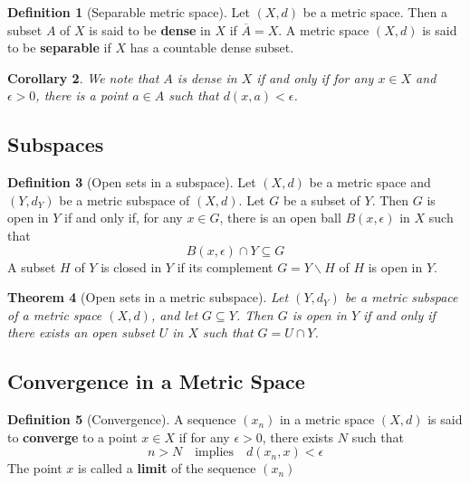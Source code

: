 \documentclass[10pt, oneside, reqno]{amsart}
\theoremstyle{plain}%
\newtheorem{thm}{Theorem}[section]
\newtheorem{cor}[thm]{Corollary}
\theoremstyle{definition}
\newtheorem{defn}[thm]{Definition}
\theoremstyle{remark}
\newcommand{\met}{(X,d)}
\newcommand{\ol}[1]{\overline{#1}}
\begin{document}
\begin{defn}[Separable metric space]
    Let $\met$ be a metric space.  Then a subset $A$ of $X$ is said to be \textbf{dense} in $X$ if $\ol A = X$.  A metric space $\met$ is said to be \textbf{separable} if $X$ has a countable dense subset.
\end{defn}

\begin{cor}
    We note that $A$ is dense in $X$ if and only if for any $x \in X$ and $\epsilon > 0$, there is a point $a \in A$ such that $d(x,a) < \epsilon$.
\end{cor}


\subsection{Subspaces} %
\label{sec:subspaces}

\begin{defn}[Open sets in a subspace]
    Let $\met$ be a metric space and $(Y, d_Y)$ be a metric subspace of $\met$.  Let $G$ be a subset of $Y$.  Then $G$ is open in $Y$ if and only if, for any $x \in G$, there is an open ball $B(x, \epsilon)$ in $X$ such that \[
        B(x, \epsilon) \cap Y \subseteq G
    \]
    A subset $H$ of $Y$ is closed in $Y$ if its complement $G = Y \backslash H$ of $H$ is open in $Y$.

\end{defn}
\begin{thm}[Open sets in a metric subspace]
    Let $(Y, d_Y)$ be a metric subspace of a metric space $\met$, and let $G \subseteq Y$.  Then $G$ is open in $Y$ if and only if there exists an open subset $U$ in $X$ such that $G = U \cap Y$.
\end{thm}




\subsection{Convergence in a Metric Space} %
\label{sub:convergence_in_a_metric_space}

\begin{defn}[Convergence]
    A sequence $(x_n)$ in a metric space $\met$ is said to \textbf{converge} to a point $x \in X$ if for any $\epsilon > 0$, there exists $N$ such that \[
        n > N \quad \text{implies} \quad d(x_n, x) < \epsilon
    \]
    The point $x$ is called a \textbf{limit} of the sequence $(x_n)$
\end{defn}
\end{document}
